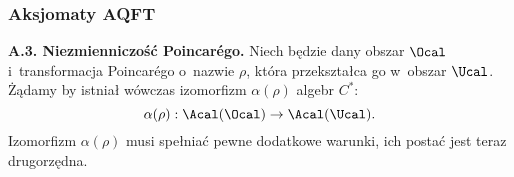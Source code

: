 \documentclass[10pt,t]{beamer}
\begin{document}
\begin{frame}
  \frametitle{Aksjomaty AQFT}


  \textbf{A.3. Niezmienniczość Poincar\'{e}go.} Niech będzie dany obszar
  $\Ocal$ i~transformacja Poincar\'{e}go o~nazwie $\rho$, która przekształca
  go w~obszar $\Ucal$. Żądamy by istniał wówczas izomorfizm $\alpha( \rho )$
  algebr $C^{ * }$:
  \begin{equation}
    \label{eq:Niespodziewane-teoretyczne-01}
    \alpha( \rho ) : \Acal( \Ocal ) \to \Acal( \Ucal ).
  \end{equation}
  Izomorfizm $\alpha( \rho )$ musi spełniać pewne dodatkowe warunki, ich postać
  jest teraz drugorzędna.


\end{frame}
\end{document}
